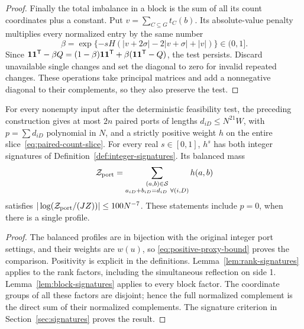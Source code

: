 \begin{proof}
Finally the total imbalance in a block is the sum of all its count
coordinates plus a constant. Put $v=\sum_{C\subseteq G}t_C(b)$.
Its absolute-value penalty multiplies
every normalized entry by the same number
\[
 \beta=\exp\{-sH(|v+2\sigma|-2|v+\sigma|+|v|)\}\in(0,1].
\]
Since
$\mathbf 1\mathbf 1^{\mathsf T}-\beta Q
=(1-\beta)\mathbf 1\mathbf 1^{\mathsf T}
 +\beta(\mathbf 1\mathbf 1^{\mathsf T}-Q)$,
the test persists. Discard unavailable single changes and set the
diagonal to zero for invalid repeated changes. These operations take
principal matrices and add a nonnegative diagonal to their complements,
so they also preserve the test.
\end{proof}

\begin{proposition}\label{prop:port-model}
For every nonempty input after the deterministic feasibility test,
the preceding construction gives at most $2n$ paired ports of lengths
$d_{iD}\le N^{21}W$, with $p=\sum d_{iD}$ polynomial in $N$, and a
strictly positive weight $h$ on the entire slice~\eqref{eq:paired-count-slice}.
For every real $s\in[0,1]$, $h^s$ has both integer signatures of
Definition~\ref{def:integer-signatures}. Its balanced mass
\[
 \mathcal Z_{\rm port}
   =\sum_{\substack{(a,b)\in\mathcal S\\
                    a_{iD}+b_{iD}=d_{iD}\ \forall(i,D)}}h(a,b)
\]
satisfies
$|\log(\mathcal Z_{\rm port}/(JZ))|\le100N^{-7}$.
These statements include $p=0$, when there is a single profile.
\end{proposition}

\begin{proof}
The balanced profiles are in bijection with the original integer port
settings, and their weights are $w(u)$, so
\eqref{eq:positive-proxy-bound} proves the comparison. Positivity is
explicit in the definitions. Lemma~\ref{lem:rank-signatures} applies
to the rank factors, including the simultaneous reflection on side 1.
Lemma~\ref{lem:block-signatures} applies to every block factor. The
coordinate groups of all these factors are disjoint; hence the full
normalized complement is the direct sum of their normalized
complements. The signature criterion in
Section~\ref{sec:signatures} proves the result.
\end{proof}
